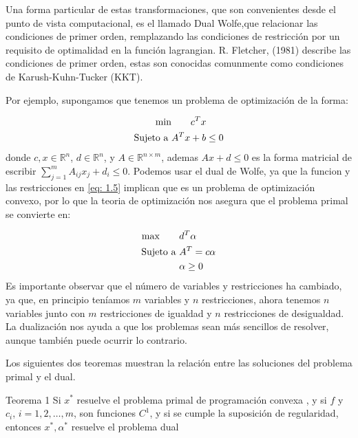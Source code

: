 \documentclass[letterpaper,12pt,oneside]{book}
\begin{document}
{{Una forma particular de estas transformaciones, que son convenientes desde el punto de vista computacional, es el llamado Dual Wolfe,que relacionar las condiciones de primer orden, remplazando las condiciones de restricción por un requisito de optimalidad en la función lagrangian. R. Fletcher, (1981) describe las condiciones de primer orden, estas son conocidas comunmente como condiciones de Karush-Kuhn-Tucker (KKT).

    
    Por ejemplo, supongamos que tenemos un problema de optimización de la forma:
    
    \begin{align}
        \min & \qquad  c^T x \label{eq: 1.5}\\
        \text{Sujeto a } & A^T x + b \leq 0 \notag
    \end{align}
    donde $c, x \in \mathbb{R}^n$, $d \in \mathbb{R}^n$, y $A \in \mathbb{R}^{n \times 		m}$, ademas $Ax + d \le 0$ es la forma matricial de escribir $\sum_{j=1}^{m} A_{ij} x_j + d_i \leq 0$.
    Podemos usar el dual de Wolfe, ya que la funcion y las restricciones en \eqref{eq: 1.5} implican que es un problema de optimización convexo, por lo que la teoria de optimización nos asegura que el problema primal se convierte en:

    \begin{align}
        \max    \qquad & d^T\alpha \\
        \text{Sujeto a } & A^T = c \alpha \notag \\
        &\alpha \geq 0 \notag
    \end{align}
Es importante observar que el número de variables y restricciones ha cambiado, ya que, en principio teníamos $m$ variables y $n$ restricciones, ahora tenemos $n$ variables junto con $m$ restricciones de igualdad y $n$ restricciones de desigualdad. La dualización nos  ayuda a que los problemas sean más sencillos de resolver, aunque también puede ocurrir lo contrario.

    
    Los siguientes dos teoremas muestran la relación entre las soluciones del problema primal y el dual.
   
   
   

    \begin{namedtheorem}{Teorema 1}
            Si \( x^* \) resuelve el problema primal de programación convexa , y si \( f \) y \( c_i \), \( i = 1,2, \ldots, m \), son funciones \( C^1 \), y si se cumple la suposición de regularidad, entonces \( x^*, \alpha^* \) resuelve el problema dual
            

\end{namedtheorem}}}
\end{document}
